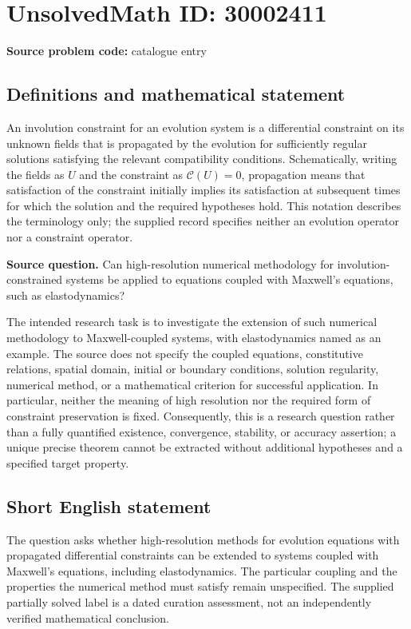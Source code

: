 \documentclass[11pt]{article}
\begin{document}
\section*{UnsolvedMath ID: 30002411}
\textbf{Source problem code:} catalogue entry
\subsection{Definitions and mathematical statement}
An involution constraint for an evolution system is a differential constraint on its unknown fields that is propagated by the evolution for sufficiently regular solutions satisfying the relevant compatibility conditions. Schematically, writing the fields as \(U\) and the constraint as \(\mathcal C(U)=0\), propagation means that satisfaction of the constraint initially implies its satisfaction at subsequent times for which the solution and the required hypotheses hold. This notation describes the terminology only; the supplied record specifies neither an evolution operator nor a constraint operator.

\textbf{Source question.} Can high-resolution numerical methodology for involution-constrained systems be applied to equations coupled with Maxwell's equations, such as elastodynamics?

The intended research task is to investigate the extension of such numerical methodology to Maxwell-coupled systems, with elastodynamics named as an example. The source does not specify the coupled equations, constitutive relations, spatial domain, initial or boundary conditions, solution regularity, numerical method, or a mathematical criterion for successful application. In particular, neither the meaning of high resolution nor the required form of constraint preservation is fixed. Consequently, this is a research question rather than a fully quantified existence, convergence, stability, or accuracy assertion; a unique precise theorem cannot be extracted without additional hypotheses and a specified target property.
\subsection{Short English statement}
The question asks whether high-resolution methods for evolution equations with propagated differential constraints can be extended to systems coupled with Maxwell's equations, including elastodynamics. The particular coupling and the properties the numerical method must satisfy remain unspecified. The supplied partially solved label is a dated curation assessment, not an independently verified mathematical conclusion.
\end{document}
